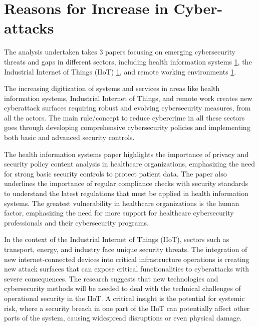 \documentclass[journal]{IEEEtran}
\begin{document}


\section{Reasons for Increase in Cyber-attacks}

The analysis undertaken takes 3 papers focusing on emerging cybersecurity threats and gaps in different sectors, including health information systems \ref{}, the Industrial Internet of Things (IIoT) \ref{}, and remote working environments \ref{}.

The increasing digitization of systems and services in areas like health information systems, Industrial Internet of Things, and remote work creates new cyberattack surfaces requiring robust and evolving cybersecurity measures, from all the actors. The main rule/concept to reduce cybercrime in all these sectors goes through  developing comprehensive cybersecurity policies and implementing both basic and advanced security controls.

The health information systems paper highlights the importance of privacy and security policy content analysis in healthcare organizations, emphasizing the need for strong basic security controls to protect patient data. The paper also underlines the importance of regular compliance checks with security standards to understand the latest regulations that must be applied in health information systems. The greatest vulnerability in healthcare organizations is the human factor, emphasizing the need for more support for healthcare cybersecurity professionals and their cybersecurity programs.

In the context of the Industrial Internet of Things (IIoT), sectors such as transport, energy, and industry face unique security threats. The integration of new internet-connected devices into critical infrastructure operations is creating new attack surfaces that can expose critical functionalities to cyberattacks with severe consequences. The research suggests that new technologies and cybersecurity methods will be needed to deal with the technical challenges of operational security in the IIoT. A critical insight is the potential for systemic risk, where a security breach in one part of the IIoT can potentially affect other parts of the system, causing widespread disruptions or even physical damage.
\end{document}
